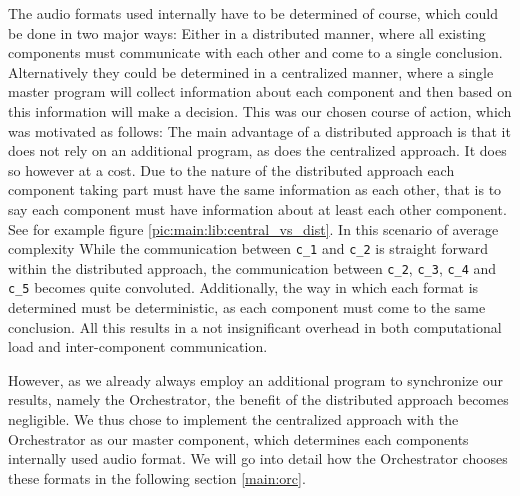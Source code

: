 
The audio formats used internally have to be determined of course, which could be done in two major ways:
Either in a distributed manner, where all existing components must communicate with each other and come to a single conclusion.
Alternatively they could be determined in a centralized manner, where a single master program will collect information about each component and then based on this information will make a decision.
This was our chosen course of action, which was motivated as follows:
The main advantage of a distributed approach is that it does not rely on an additional program, as does the centralized approach.
It does so however at a cost. 
Due to the nature of the distributed approach each component taking part must have the same information as each other, that is to say each component must have information about at least each other component.
See for example figure \ref{pic:main:lib:central_vs_dist}.
In this scenario of average complexity 
While the communication between \texttt{c\_1} and \texttt{c\_2} is straight forward within the distributed approach, the communication between \texttt{c\_2}, \texttt{c\_3}, \texttt{c\_4} and \texttt{c\_5} becomes quite convoluted.
Additionally, the way in which each format is determined must be deterministic, as each component must come to the same conclusion.
All this results in a not insignificant overhead in both computational load and inter-component communication.

However, as we already always employ an additional program to synchronize our results, namely the Orchestrator, the benefit of the distributed approach becomes negligible.
We thus chose to implement the centralized approach with the Orchestrator as our master component, which determines each components internally used audio format.
We will go into detail how the Orchestrator chooses these formats in the following section \ref{main:orc}.

